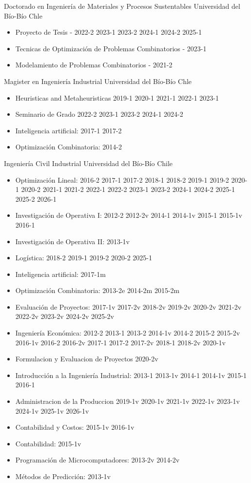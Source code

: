 {Doctorado en Ingenier\'ia de Materiales y Procesos Sustentables}
{Universidad del B\'io-B\'io}
{Chle}
{}
{\begin{itemize}
\item Proyecto de Tesis - 2022-2 2023-1 2023-2 2024-1 2024-2 2025-1
\item Tecnicas de Optimizaci\'on de Problemas Combinatorios - 2023-1
\item Modelamiento de Problemas Combinatorios - 2021-2
\end{itemize}}

{Magister en Ingenier\'ia Industrial}
{Universidad del B\'io-B\'io}
{Chle}
{}
{\begin{itemize}
\item Heuristicas and Metaheuristicas 2019-1 2020-1 2021-1 2022-1 2023-1
\item Seminario de Grado 2022-2 2023-1 2023-2 2024-1 2024-2
\item Inteligencia artificial: 2017-1 2017-2
\item Optimizaci\'on Combinatoria: 2014-2
\end{itemize}}

{Ingenier\'ia Civil Industrial}
{Universidad del B\'io-B\'io}
{Chile}
{}
{\begin{itemize}
\item Optimizaci\'on Lineal: 2016-2 2017-1 2017-2 2018-1 2018-2 2019-1 2019-2 2020-1 2020-2 2021-1 2021-2 2022-1 2022-2 2023-1 2023-2 2024-1 2024-2 2025-1 2025-2 2026-1
\item Investigaci\'on de Operativa I: 2012-2 2012-2v 2014-1 2014-1v 2015-1 2015-1v 2016-1
\item Investigaci\'on de Operativa II: 2013-1v
\item Log\'istica: 2018-2 2019-1 2019-2 2020-2 2025-1
\item Inteligencia artificial: 2017-1m
\item Optimizaci\'on Combinatoria: 2013-2e 2014-2m 2015-2m
\item Evaluaci\'on de Proyectos: 2017-1v 2017-2v 2018-2v 2019-2v 2020-2v 2021-2v 2022-2v 2023-2v 2024-2v 2025-2v
\item Ingenier\'ia Econ\'omica: 2012-2 2013-1 2013-2 2014-1v 2014-2 2015-2 2015-2v 2016-1v 2016-2 2016-2v 2017-1 2017-2 2017-2v 2018-1 2018-2v 2020-1v
\item Formulacion y Evaluacion de Proyectos 2020-2v
\item Introducci\'on a la Ingenier\'ia Industrial: 2013-1 2013-1v 2014-1 2014-1v 2015-1 2016-1
\item Administracion de la Produccion 2019-1v 2020-1v 2021-1v 2022-1v 2023-1v 2024-1v 2025-1v 2026-1v
\item Contabilidad y Costos: 2015-1v 2016-1v
\item Contabilidad: 2015-1v
\item Programaci\'on de Microcomputadores: 2013-2v 2014-2v
\item M\'etodos de Predicci\'on: 2013-1v
\end{itemize}}

